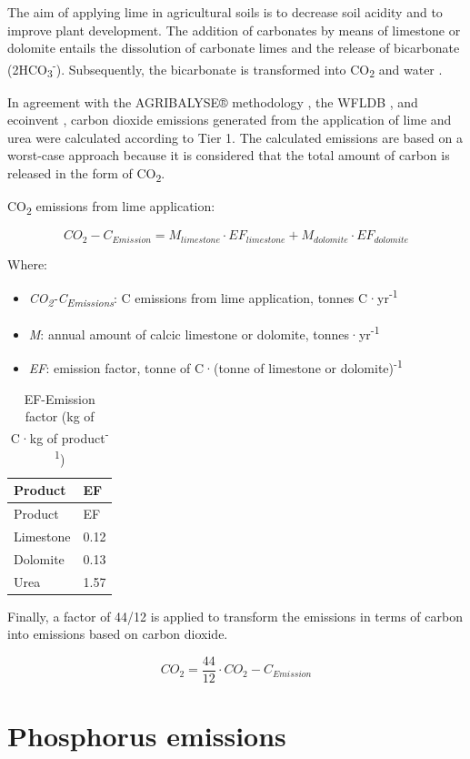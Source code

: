 \documentclass[openany]{book}
\begin{document}
The aim of applying lime in agricultural soils is to decrease soil acidity and to improve plant development. The addition of carbonates by means of limestone or dolomite entails the dissolution of carbonate limes and the release of bicarbonate (2HCO\textsubscript{3}\textsuperscript{-}). Subsequently, the bicarbonate is transformed into CO\textsubscript{2} and water \citep{IPCC2006}.

In agreement with the AGRIBALYSE® methodology \citep{Koch2015}, the WFLDB \citep{nemecek2014}, and ecoinvent \citep{nemecek2011}, carbon dioxide emissions generated from the application of lime and urea were calculated according to \citet{IPCC2006} Tier 1. The calculated emissions are based on a worst-case approach because it is considered that the total amount of carbon is released in the form of CO\textsubscript{2}.

CO\textsubscript{2} emissions from lime application:

\[CO_2-C_{Emission}=M_{limestone} \cdot EF_{limestone} + M_{dolomite} \cdot EF_{dolomite}\]

Where:

\begin{itemize}
\item
  \emph{CO\textsubscript{2}-C\textsubscript{Emissions}}: C emissions from lime application, tonnes C·yr\textsuperscript{-1}
\item
  \emph{M}: annual amount of calcic limestone or dolomite, tonnes·yr\textsuperscript{-1}
\item
  \emph{EF}: emission factor, tonne of C·(tonne of limestone or dolomite)\textsuperscript{-1}
\end{itemize}

\begin{longtable}[]{@{}ll@{}}
\caption{\label{tab:carbon-dioxide-ef} EF-Emission factor (kg of C·kg of product\textsuperscript{-1})}\tabularnewline
\toprule
Product & EF\tabularnewline
\midrule
\endfirsthead
\toprule
Product & EF\tabularnewline
\midrule
\endhead
Limestone & 0.12\tabularnewline
Dolomite & 0.13\tabularnewline
Urea & 1.57\tabularnewline
\bottomrule
\end{longtable}

Finally, a factor of 44/12 is applied to transform the emissions in terms of carbon into emissions based on carbon dioxide.

\[CO_2= \frac{44}{12} \cdot CO_2-C_{Emission}\]

\hypertarget{phosphorous-emissions}{%
\section{Phosphorus emissions}\label{phosphorous-emissions}}
\end{document}
